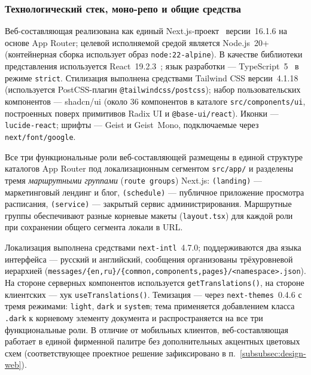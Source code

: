 \subsubsection{Технологический стек, моно-репо и общие средства}
\label{subsubsec:impl-web-stack}

Веб-составляющая реализована как единый Next.js-проект~\cite{nextjs} версии~16.1.6 на основе App Router; целевой исполняемой средой является Node.js~20+ (контейнерная сборка использует образ \texttt{node:22-alpine}). В качестве библиотеки представления используется React~19.2.3~\cite{react}; язык разработки --- TypeScript~5~\cite{typescript} в режиме \texttt{strict}. Стилизация выполнена средствами Tailwind CSS версии~4.1.18 (используется PostCSS-плагин \texttt{@tailwindcss/\allowbreak postcss}); набор пользовательских компонентов --- shadcn/ui (около 36 компонентов в каталоге \texttt{src/\allowbreak components/\allowbreak ui}, построенных поверх примитивов Radix UI и \texttt{@base-ui/\allowbreak react}). Иконки --- \texttt{lucide-react}; шрифты --- Geist и Geist~Mono, подключаемые через \texttt{next/\allowbreak font/\allowbreak google}.

Все три функциональные роли веб-составляющей размещены в единой структуре каталогов App Router под локализационным сегментом \texttt{src/\allowbreak app/\allowbreak [locale]} и разделены тремя \emph{маршрутными группами} (\texttt{route groups}) Next.js: \texttt{(landing)} --- маркетинговый лендинг и блог, \texttt{(schedule)} --- публичное приложение просмотра расписания, \texttt{(service)} --- закрытый сервис администрирования. Маршрутные группы обеспечивают разные корневые макеты (\texttt{layout.\allowbreak tsx}) для каждой роли при сохранении общего сегмента локали в URL.

Локализация выполнена средствами \texttt{next-intl}~4.7.0; поддерживаются два языка интерфейса --- русский и английский, сообщения организованы трёхуровневой иерархией (\texttt{messages/\allowbreak \{en,ru\}/\allowbreak \{common,components,pages\}/\allowbreak <namespace>.json}). На стороне серверных компонентов используется \texttt{getTranslations()}, на стороне клиентских --- хук \texttt{useTranslations()}. Темизация --- через \texttt{next-themes}~0.4.6 с тремя режимами: \texttt{light}, \texttt{dark} и \texttt{system}; тема применяется добавлением класса \texttt{.dark} к корневому элементу документа и распространяется на все три функциональные роли. В отличие от мобильных клиентов, веб-составляющая работает в единой фирменной палитре без дополнительных акцентных цветовых схем (соответствующее проектное решение зафиксировано в п.~\ref{subsubsec:design-web}).

